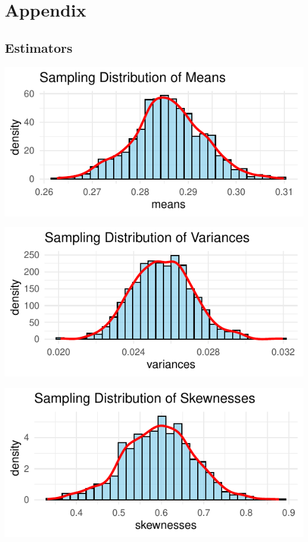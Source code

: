 \documentclass{article}\usepackage[]{graphicx}\usepackage[]{xcolor}
\makeatletter
\def\maxwidth{ %
  \ifdim\Gin@nat@width>\linewidth
    \linewidth
  \else
    \Gin@nat@width
  \fi
}
\newenvironment{knitrout}{}{} %
\makeatother
\begin{document}
\newpage

\section{Appendix}
\subsection{Estimators}
\begin{knitrout}
\color{fgcolor}
\includegraphics[width=\maxwidth]{figure/unnamed-chunk-6-1} 
\end{knitrout}

\begin{knitrout}
\color{fgcolor}
\includegraphics[width=\maxwidth]{figure/unnamed-chunk-7-1} 
\end{knitrout}

\begin{knitrout}
\color{fgcolor}
\includegraphics[width=\maxwidth]{figure/unnamed-chunk-8-1} 
\end{knitrout}
\end{document}
